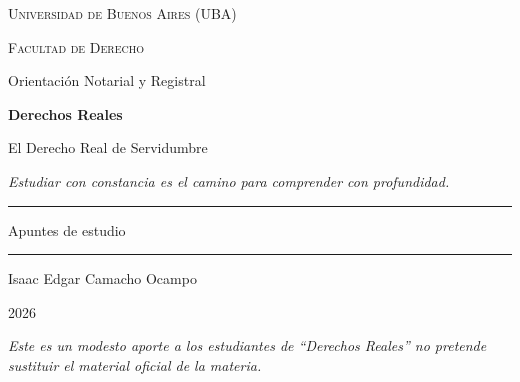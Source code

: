 \documentclass[12pt,oneside]{book}
\newcommand{\universidad}{Universidad de Buenos Aires (UBA)}
\newcommand{\facultad}{Facultad de Derecho}
\newcommand{\carrera}{Orientación Notarial y Registral}
\newcommand{\materia}{Derechos Reales}
\newcommand{\autor}{Isaac Edgar Camacho Ocampo}
\newcommand{\anio}{2026}
\begin{document}
\begin{titlepage}

\thispagestyle{empty}

\begin{center}

\vspace*{1cm}

{\large \textsc{\universidad}}

\vspace{0.2cm}

{\large \textsc{\facultad}}

\vspace{0.2cm}

{\large \carrera}

\vspace{3cm}

{\Huge \textbf{\materia}}

\vspace{1cm}

{\LARGE El Derecho Real de Servidumbre}

\vspace{0.8cm}

{\small \textit{Estudiar con constancia es el camino para comprender con profundidad.}}

\vspace{1.2cm}

\rule{0.70\textwidth}{0.5pt}

\vspace{0.5cm}

{\large Apuntes de estudio}

\vspace{0.5cm}

\rule{0.70\textwidth}{0.5pt}

\vfill

{\large \autor}

\vspace{0.3cm}

{\large \anio}

\end{center}

\vfill

\begin{flushleft}
\textit{Este es un modesto aporte a los estudiantes de ``Derechos Reales'' no pretende sustituir el material oficial de la materia.}
\end{flushleft}

\end{titlepage}
\end{document}
